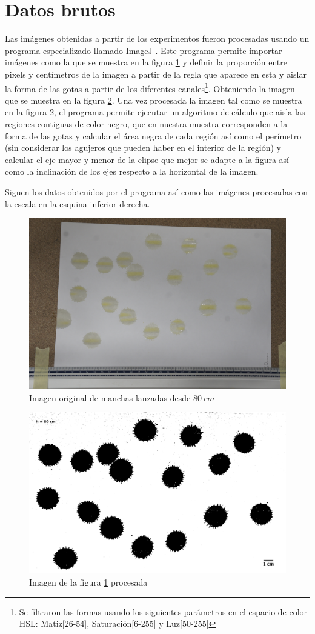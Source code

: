 \pagebreak \section{Datos brutos} \label{sec:datos_brutos} Las imágenes
obtenidas a partir de los experimentos fueron procesadas usando un programa
especializado llamado ImageJ \cite{imagej}. Este programa permite importar
imágenes como la que se muestra en la figura \ref{fig:80img} y definir la
proporción entre pixels y centímetros de la imagen a partir de la regla que
aparece en esta y aislar la forma de las gotas a partir de los diferentes
canales\footnote{Se filtraron las formas usando los siguientes parámetros en el
espacio de color HSL: Matiz[26-54], Saturación[6-255] y Luz[50-255]}.
Obteniendo la imagen que se muestra en la figura \ref{fig:80proc}.  Una vez
procesada la imagen tal como se muestra en la figura \ref{fig:80proc}, el
programa permite ejecutar un algoritmo de cálculo que aisla las regiones
contiguas de color negro, que en nuestra muestra corresponden a la forma de las
gotas y calcular el área negra de cada región así como el perímetro (sin
considerar los agujeros que pueden haber en el interior de la región) y
calcular el eje mayor y menor de la elipse que mejor se adapte a la figura así
como la inclinación de los ejes respecto a la horizontal de la imagen.

Siguen los datos obtenidos por el programa así como las imágenes procesadas con
la escala en la esquina inferior derecha.

\begin{figure}[htpb] \centering
\includegraphics[width=0.60\linewidth]{src/80.JPG} \caption{Imagen original de
manchas lanzadas desde $80\ cm$} \label{fig:80img} \end{figure}
\begin{figure}[htpb] \centering
    \includegraphics[width=0.60\linewidth]{src/80.png} \caption{Imagen de la
figura \ref{fig:80img} procesada} \label{fig:80proc} \end{figure}

